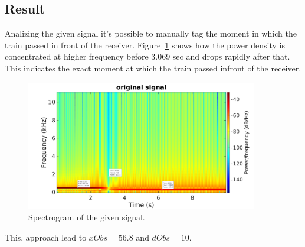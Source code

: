 \subsection{Result}

Analizing the given signal it's possible to manually tag the moment in which the
train passed in front of the receiver. Figure~\ref{fig:spectrogram_original}
shows how the power density is concentrated at higher frequency before 3.069 sec
and drops rapidly after that. This indicates the exact moment at which the train
passed infront of the receiver.

\begin{figure}[H]
	\centering
	\includegraphics[width=0.9\textwidth]{figs/ex1_spectrogram_orig.png}
	\caption{Spectrogram of the given signal.}
	\label{fig:spectrogram_original}
\end{figure}

This, approach lead to $xObs = 56.8$ and $dObs = 10$.



